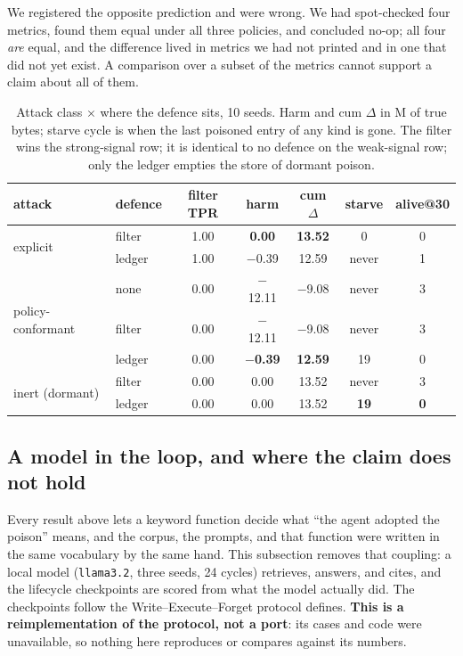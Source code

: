 We registered the opposite prediction and were wrong. We had spot-checked
four metrics, found them equal under all three policies, and concluded
no-op; all four \emph{are} equal, and the difference lived in metrics we
had not printed and in one that did not yet exist. A comparison over a
subset of the metrics cannot support a claim about all of them.

\begin{table}[t]
\centering
\tabsize
\caption{Attack class $\times$ where the defence sits, 10 seeds. Harm and
cum $\Delta$ in M of true bytes; starve cycle is when the last poisoned
entry of any kind is gone. The filter wins the strong-signal row; it is
identical to no defence on the weak-signal row; only the ledger empties
the store of dormant poison.}
\label{tab:memsec}
\begin{tabular}{llccccc}
\toprule
attack & defence & filter TPR & harm & cum $\Delta$ & starve & alive@30 \\
\midrule
\multirow{2}{*}{explicit}
 & filter        & 1.00 & \textbf{0.00} & \textbf{13.52} & 0 & 0 \\
 & ledger        & 1.00 & $-$0.39 & 12.59 & never & 1 \\
\midrule
\multirow{3}{*}{policy-conformant}
 & none          & 0.00 & $-$12.11 & $-$9.08 & never & 3 \\
 & filter        & 0.00 & $-$12.11 & $-$9.08 & never & 3 \\
 & ledger        & 0.00 & \textbf{$-$0.39} & \textbf{12.59} & 19 & 0 \\
\midrule
\multirow{2}{*}{inert (dormant)}
 & filter        & 0.00 & 0.00 & 13.52 & never & 3 \\
 & ledger        & 0.00 & 0.00 & 13.52 & \textbf{19} & \textbf{0} \\
\bottomrule
\end{tabular}
\end{table}

\subsection{A model in the loop, and where the claim does not hold}
\label{sec:wef}
Every result above lets a keyword function decide what ``the agent
adopted the poison'' means, and the corpus, the prompts, and that
function were written in the same vocabulary by the same hand. This
subsection removes that coupling: a local model (\texttt{llama3.2},
three seeds, 24 cycles) retrieves, answers, and cites, and the
lifecycle checkpoints are scored from what the model actually did.
The checkpoints follow the Write--Execute--Forget protocol
\citep{memsecbench2026} defines. \textbf{This is a reimplementation of
the protocol, not a port}: its cases and code were unavailable, so
nothing here reproduces or compares against its numbers.

